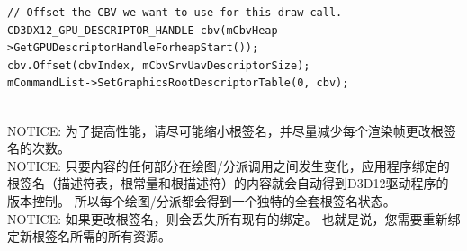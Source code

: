 \documentclass[11pt,a4paper,oldfontcommands]{memoir}
\begin{document}
{\begin{flushleft}
\begin{lstlisting}
// Offset the CBV we want to use for this draw call.
CD3DX12_GPU_DESCRIPTOR_HANDLE cbv(mCbvHeap->GetGPUDescriptorHandleForheapStart());
cbv.Offset(cbvIndex, mCbvSrvUavDescriptorSize);
mCommandList->SetGraphicsRootDescriptorTable(0, cbv);
\end{lstlisting}
~\\
NOTICE: 为了提高性能，请尽可能缩小根签名，并尽量减少每个渲染帧更改根签名的次数。\\
NOTICE: 只要内容的任何部分在绘图/分派调用之间发生变化，应用程序绑定的根签名（描述符表，根常量和根描述符）的内容就会自动得到D3D12驱动程序的版本控制。 所以每个绘图/分派都会得到一个独特的全套根签名状态。\\
NOTICE: 如果更改根签名，则会丢失所有现有的绑定。 也就是说，您需要重新绑定新根签名所需的所有资源。
\end{flushleft}

}
\end{document}
